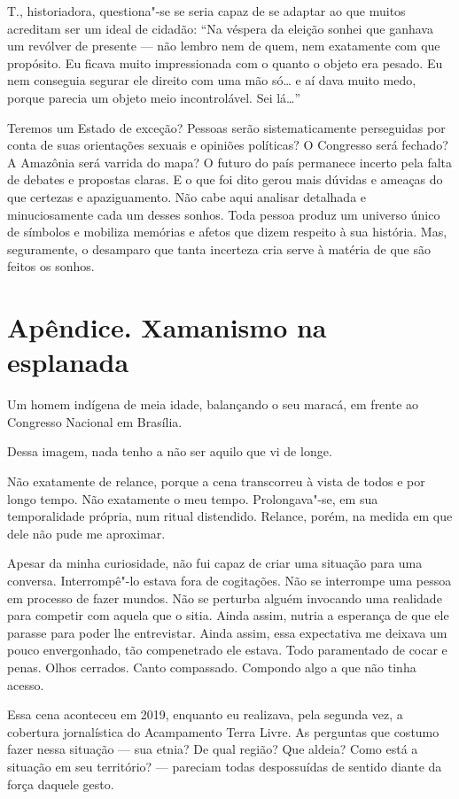 T., historiadora, questiona"-se se seria capaz de se adaptar ao que
muitos acreditam ser um ideal de cidadão: ``Na véspera da eleição sonhei
que ganhava um revólver de presente --- não lembro nem de quem, nem
exatamente com que propósito. Eu ficava muito impressionada com o
quanto o objeto era pesado. Eu nem conseguia segurar ele direito com uma
mão só\ldots{} e aí dava muito medo, porque parecia um objeto meio
incontrolável. Sei lá\ldots{}''

\asterisc

Teremos um Estado de exceção? Pessoas serão sistematicamente perseguidas
por conta de suas orientações sexuais e opiniões políticas? O Congresso
será fechado? A Amazônia será varrida do mapa? O futuro do país
permanece incerto pela falta de debates e propostas claras. E o que foi
dito gerou mais dúvidas e ameaças do que certezas e apaziguamento. Não
cabe aqui analisar detalhada e minuciosamente cada um desses sonhos.
Toda pessoa produz um universo único de símbolos e mobiliza memórias e
afetos que dizem respeito à sua história. Mas, seguramente, o desamparo
que tanta incerteza cria serve à matéria de que são feitos os sonhos.


\chapter{Apêndice. Xamanismo na esplanada}

Um homem indígena de meia idade, balançando o seu maracá, em frente ao
Congresso Nacional em Brasília.

Dessa imagem, nada tenho a não ser aquilo que vi de longe.

Não exatamente de relance, porque a cena transcorreu à vista de todos e
por longo tempo. Não exatamente o meu tempo. Prolongava"-se, em sua
temporalidade própria, num ritual distendido. Relance, porém, na medida
em que dele não pude me aproximar.

Apesar da minha curiosidade, não fui capaz de criar uma situação para
uma conversa. Interrompê"-lo estava fora de cogitações. Não se interrompe uma pessoa em processo de fazer
mundos. Não se perturba alguém invocando uma realidade para competir com
aquela que o sitia. Ainda assim, nutria a esperança de que ele parasse
para poder lhe entrevistar. Ainda assim, essa expectativa me deixava um
pouco envergonhado, tão compenetrado ele estava. Todo paramentado de
cocar e penas. Olhos cerrados. Canto compassado. Compondo algo a que não
tinha acesso.

Essa cena aconteceu em 2019, enquanto eu realizava, pela segunda vez, a cobertura
jornalística do Acampamento Terra Livre. As perguntas que costumo fazer nessa situação ---
sua etnia? De qual região? Que aldeia? Como está a situação em seu
território? --- pareciam todas despossuídas de sentido diante da força daquele
gesto.

